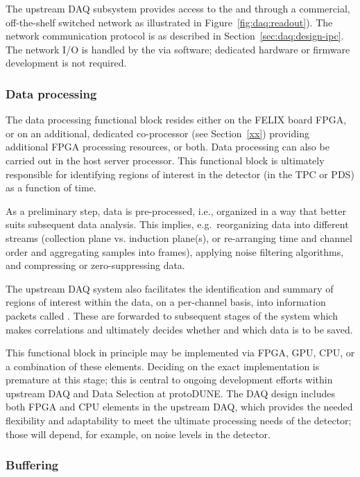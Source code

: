 The upstream DAQ subsystem provides access to the  and  through a commercial, off-the-shelf switched network as illustrated in Figure~\ref{fig:daq:readout}).
The network communication protocol is as described in Section~\ref{sec:daq:design-ipc}.
The network I/O is handled by the  via software; dedicated hardware or firmware development is not required.

\subsubsection{Data processing}
\label{sec:fd-daq:upstream-proc}

The data processing functional block resides either on the FELIX board FPGA, or on
an additional, dedicated co-processor (see Section~\ref{xx}) providing additional FPGA
processing resources, or both. Data processing can also be carried out in the host
server processor. This functional block is ultimately
responsible for identifying regions of interest in the
detector (in the TPC or PDS) as a function of time.

As a preliminary step, data is pre-processed, i.e., organized in a way
that better suits subsequent data analysis. This implies, e.g.~reorganizing
data into different streams (collection plane vs. induction plane(s),
or re-arranging time and channel order and aggregating samples into frames), applying noise filtering algorithms, and compressing or zero-suppressing data.

The upstream DAQ system also facilitates the identification and
summary of regions of interest within the data, 
on a per-channel basis, into information packets
called .  These are forwarded to subsequent
stages of the
 system which makes correlations and ultimately decides whether and which data is to be saved.

This functional block in principle may be implemented via FPGA, GPU, CPU, or a
combination of these elements. Deciding on the exact implementation is
premature at this stage; this is central to ongoing development efforts 
within upstream DAQ and Data Selection at protoDUNE. The DAQ design includes both FPGA and
CPU elements in the upstream DAQ, which provides the needed
flexibility and 
adaptability to meet the ultimate processing needs of the detector;
those will depend, for example, on noise levels in the detector.

\subsubsection{Buffering}
\label{sec:fd-daq:upstream-buf}

